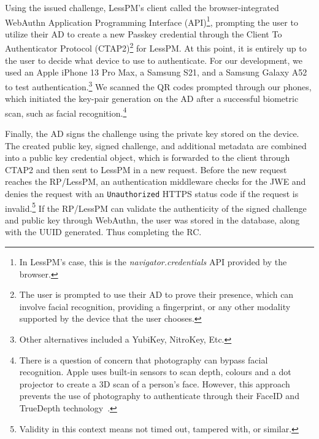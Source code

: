 Using the issued challenge, LessPM's client called the browser-integrated
WebAuthn Application Programming Interface (API)\footnote{
  In LessPM's case, this is the \textit{navigator.credentials} API provided by
  the browser.
},
prompting the user to utilize their AD to create a new Passkey credential
through the Client To Authenticator Protocol (CTAP2)\footnote{
  The user is prompted to use their AD to prove their presence, which can
  involve facial recognition, providing a fingerprint, or any other modality
  supported by the device that the user chooses.
} for
LessPM\@.
At this point, it is entirely up to the user to decide what device to use to
authenticate.
For our development, we used an Apple iPhone 13 Pro Max, a Samsung S21, and a
Samsung Galaxy A52 to test authentication.\footnote{
  Other alternatives included a YubiKey, NitroKey, Etc.
}
We scanned the QR codes prompted through our phones, which initiated the
key-pair generation on the AD after a successful biometric scan, such as
facial recognition.\footnote{
  There is a question of concern that photography can bypass facial recognition.
  Apple uses built-in sensors to scan depth, colours and a dot projector to
  create a 3D scan of a person's face.
  However, this approach prevents the use of photography to authenticate through
  their FaceID and TrueDepth technology~\cite{apple-support}.
}

Finally, the AD signs the challenge using the private key stored on the
device.
The created public key, signed challenge, and additional metadata are combined
into a public key credential object, which is forwarded to the client
through CTAP2 and then sent to LessPM in a new request.
Before the new request reaches the RP/LessPM, an authentication middleware
checks for the JWE and denies the request with an \texttt{Unauthorized} HTTPS
status code if the request is invalid.\footnote{
  Validity in this context means not timed out, tampered with, or similar.
}
If the RP/LessPM can validate the authenticity of the signed challenge and
public key through WebAuthn, the user was stored in the database, along with the
UUID generated.
Thus completing the RC\@.

